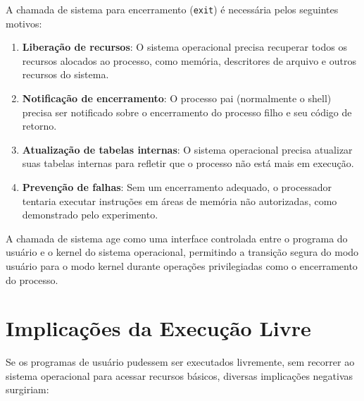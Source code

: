 \documentclass[12pt,a4paper]{article}
\begin{document}
A chamada de sistema para encerramento (\texttt{exit}) é necessária pelos seguintes motivos:

\begin{enumerate}
    \item \textbf{Liberação de recursos}: O sistema operacional precisa recuperar todos os recursos alocados ao processo, como memória, descritores de arquivo e outros recursos do sistema.
    
    \item \textbf{Notificação de encerramento}: O processo pai (normalmente o shell) precisa ser notificado sobre o encerramento do processo filho e seu código de retorno.
    
    \item \textbf{Atualização de tabelas internas}: O sistema operacional precisa atualizar suas tabelas internas para refletir que o processo não está mais em execução.
    
    \item \textbf{Prevenção de falhas}: Sem um encerramento adequado, o processador tentaria executar instruções em áreas de memória não autorizadas, como demonstrado pelo experimento.
\end{enumerate}

A chamada de sistema age como uma interface controlada entre o programa do usuário e o kernel do sistema operacional, permitindo a transição segura do modo usuário para o modo kernel durante operações privilegiadas como o encerramento do processo.

\section{Implicações da Execução Livre}

Se os programas de usuário pudessem ser executados livremente, sem recorrer ao sistema operacional para acessar recursos básicos, diversas implicações negativas surgiriam:
\end{document}
